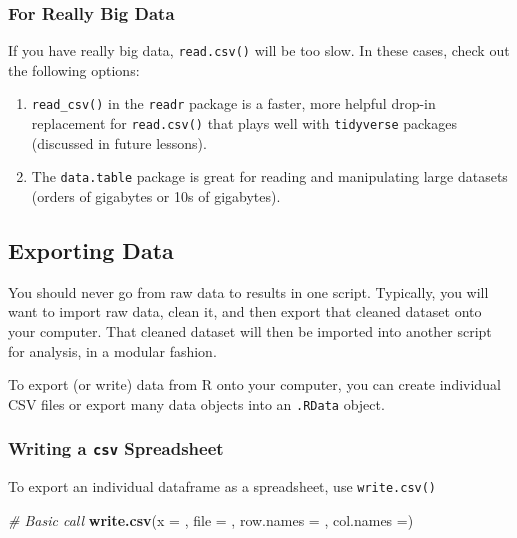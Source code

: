\documentclass[]{book}
\newenvironment{Shaded}{\begin{snugshade}}{\end{snugshade}}
\newcommand{\KeywordTok}[1]{\textcolor[rgb]{0.13,0.29,0.53}{\textbf{#1}}}
\newcommand{\DataTypeTok}[1]{\textcolor[rgb]{0.13,0.29,0.53}{#1}}
\newcommand{\CommentTok}[1]{\textcolor[rgb]{0.56,0.35,0.01}{\textit{#1}}}
\newcommand{\NormalTok}[1]{#1}
\providecommand{\tightlist}{%
  \setlength{\itemsep}{0pt}\setlength{\parskip}{0pt}}
\begin{document}
\subsubsection*{For Really Big Data}\label{for-really-big-data}

If you have really big data, \texttt{read.csv()} will be too slow. In
these cases, check out the following options:

\begin{enumerate}
\def\labelenumi{\arabic{enumi})}
\tightlist
\item
  \texttt{read\_csv()} in the \texttt{readr} package is a faster, more
  helpful drop-in replacement for \texttt{read.csv()} that plays well
  with \texttt{tidyverse} packages (discussed in future lessons).
\item
  The \texttt{data.table} package is great for reading and manipulating
  large datasets (orders of gigabytes or 10s of gigabytes).
\end{enumerate}

\subsection{Exporting Data}\label{exporting-data}

You should never go from raw data to results in one script. Typically,
you will want to import raw data, clean it, and then export that cleaned
dataset onto your computer. That cleaned dataset will then be imported
into another script for analysis, in a modular fashion.

To export (or write) data from R onto your computer, you can create
individual CSV files or export many data objects into an \texttt{.RData}
object.

\subsubsection*{\texorpdfstring{Writing a \texttt{csv}
Spreadsheet}{Writing a csv Spreadsheet}}\label{writing-a-csv-spreadsheet}

To export an individual dataframe as a spreadsheet, use
\texttt{write.csv()}

\begin{Shaded}
\begin{Highlighting}[]
\CommentTok{# Basic call}
\KeywordTok{write.csv}\NormalTok{(}\DataTypeTok{x =}\NormalTok{ , }\DataTypeTok{file =}\NormalTok{ , }\DataTypeTok{row.names =}\NormalTok{ , }\DataTypeTok{col.names =}\NormalTok{)}
\end{Highlighting}
\end{Shaded}
\end{document}
